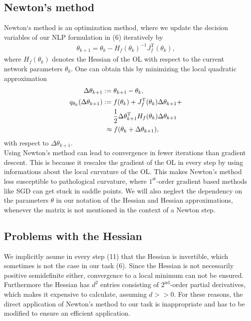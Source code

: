 \documentclass[conference]{IEEEtran}
\begin{document}
\subsection{Newton's method}
\noindent
Newton`s method is an optimization method, where we update the decision variables of our NLP formulation in (6) iteratively by
\begin{align}
 \theta_{k+1} = \theta_{k} -H_{f}(\theta_{k})^{-1} J_{f}^{\mathrm{T}}(\theta_{k}),
\end{align}
where $H_{f}(\theta_{k})$ denotes the Hessian of the OL with respect to the current network parameters $\theta_{k}$. One can obtain this by minimizing the local quadratic approximation
\begin{align}
\text{ }\Delta\theta_{k+1} &:= \theta_{k+1} - \theta_{k},\\
q_{\theta_{k}}(\Delta\theta_{k+1})&:= f(\theta_{k}) + J_{f}^{\mathrm{T}}(\theta_{k})\Delta\theta_{k+1} + \notag\\  
&\:\:\:\:\:\:\:\frac{1}{2}\Delta\theta_{k+1}^{\mathrm{T}}H_{f}(\theta_{k})\Delta\theta_{k+1}\\
&\text{ }\approx f(\theta_{k} + \Delta\theta_{k+1}),
\end{align}
with respect to $\Delta\theta_{k+1}$. \\
Using Newton's method can lead to convergence in fewer iterations than gradient descent. This is because it rescales the gradient of the OL in every step by using informations about the local curvature of the OL. This makes Newton's method less susceptible to pathological curvature, where $1^{\text{st}}$-order gradient based methods like SGD can get stuck in saddle points. We will also neglect the dependency on the parameters $\theta$ in our notation of the Hessian and Hessian approximations, whenever the matrix is not mentioned in the context of a Newton step.


\subsection{Problems with the Hessian}
\noindent
We implicitly asume in every step (11) that the Hessian is invertible, which sometimes is not the case in our task (6). Since the Hessian is not necessarily positive semidefinite either, convergence to a local minimum can not be ensured. Furthermore the Hessian has $d^{2}$ entries consisting of $2^{\text{nd}}$-order partial derivatives, which makes it expensive to calculate, assuming $d>>0$. For these reasons, the direct application of Newton's method to our task is inappropriate and has to be modified to ensure an efficient application.
\end{document}
